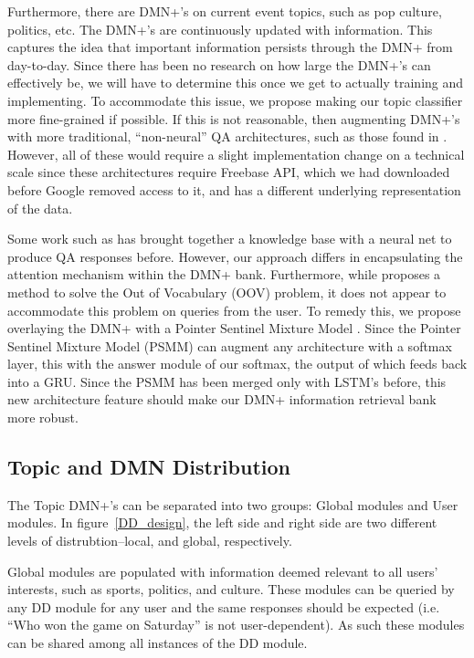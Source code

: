\documentclass[10pt,twoside,twocolumn]{article}
\begin{document}
\noindent
Furthermore, there are DMN+'s on current event topics, such as pop culture, politics, etc. The DMN+'s are continuously updated with information. This captures the idea that important information persists through the DMN+ from day-to-day. Since there has been no research on how large the DMN+'s can effectively be, we will have to determine this once we get to actually training and implementing. To accommodate this issue, we propose making our topic classifier more fine-grained if possible. If this is not reasonable, then augmenting DMN+'s with more traditional, ``non-neural'' QA architectures, such as those found in \cite{Iyyer2014, Yao2014a, Yao2014b}. However, all of these would require a slight implementation change on a technical scale since these architectures require Freebase API, which we had downloaded before Google removed access to it, and has a different underlying representation of the data.

\noindent
Some work such as \cite{Zhang2016} has brought together a knowledge base with a neural net to produce QA responses before. However, our approach differs in encapsulating the attention mechanism within the DMN+ bank. Furthermore, while \cite{Zhang2016} proposes a method to solve the Out of Vocabulary (OOV) problem, it does not appear to accommodate this problem on queries from the user. To remedy this, we propose overlaying the DMN+ \cite{Xiong2016} with a Pointer Sentinel Mixture Model \cite{Merity2016}. Since the Pointer Sentinel Mixture Model (PSMM) can augment any architecture with a softmax layer, this with the answer module of our softmax, the output of which feeds back into a GRU. Since the PSMM has been merged only with LSTM's before, this new architecture feature should make our DMN+ information retrieval bank more robust.



\subsection{Topic and DMN Distribution}
The Topic DMN+'s can be separated into two groups: Global modules and User modules. In figure~\ref{DD_design}, the left side and right side are two different levels of distrubtion--local, and global, respectively.

\noindent
Global modules are populated with information deemed relevant to all users' interests, such as sports, politics, and culture. These modules can be queried by any DD module for any user and the same responses should be expected (i.e. ``Who won the game on Saturday'' is not user-dependent). As such these modules can be shared among all instances of the DD module.
\end{document}
